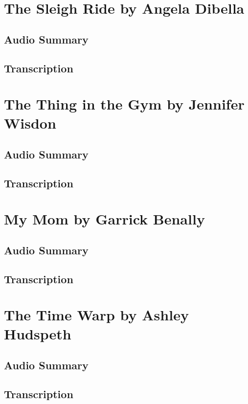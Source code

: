 \section{The Sleigh Ride by Angela Dibella}

\subsection{Audio Summary}

\subsection{Transcription}

\section{The Thing in the Gym by Jennifer Wisdon}

\subsection{Audio Summary}

\subsection{Transcription}

\section{My Mom by Garrick Benally}

\subsection{Audio Summary}

\subsection{Transcription}

\section{The Time Warp by Ashley Hudspeth}

\subsection{Audio Summary}

\subsection{Transcription}

